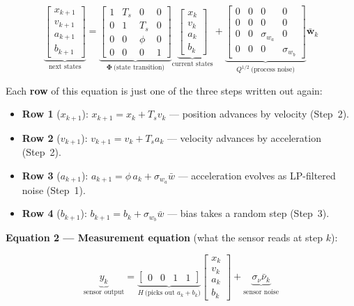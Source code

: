 \documentclass[12pt, a4paper]{article}
\begin{document}
\[
\underbrace{
\begin{bmatrix} x_{k+1} \\ v_{k+1} \\ a_{k+1} \\ b_{k+1} \end{bmatrix}
}_{\text{next states}}
=
\underbrace{
\begin{bmatrix}
  1 & T_s & 0    & 0 \\
  0 & 1   & T_s  & 0 \\
  0 & 0   & \phi & 0 \\
  0 & 0   & 0    & 1
\end{bmatrix}
}_{\boldsymbol{\Phi}\ \text{(state transition)}}
\underbrace{
\begin{bmatrix} x_k \\ v_k \\ a_k \\ b_k \end{bmatrix}
}_{\text{current states}}
+
\underbrace{
\begin{bmatrix}
  0 & 0 & 0            & 0            \\
  0 & 0 & 0            & 0            \\
  0 & 0 & \sigma_{w_a} & 0            \\
  0 & 0 & 0            & \sigma_{w_b}
\end{bmatrix}
}_{Q^{1/2}\ \text{(process noise)}}
\bar{\mathbf{w}}_k
\]

Each \textbf{row} of this equation is just one of the three steps
written out again:
\begin{itemize}[leftmargin=1.4em, topsep=2pt]
  \item \textbf{Row 1} ($x_{k+1}$): $x_{k+1} = x_k + T_s v_k$
        \quad --- position advances by velocity (Step~2).
  \item \textbf{Row 2} ($v_{k+1}$): $v_{k+1} = v_k + T_s a_k$
        \quad --- velocity advances by acceleration (Step~2).
  \item \textbf{Row 3} ($a_{k+1}$): $a_{k+1} = \phi\, a_k + \sigma_{w_a}\bar{w}$
        \quad --- acceleration evolves as LP-filtered noise (Step~1).
  \item \textbf{Row 4} ($b_{k+1}$): $b_{k+1} = b_k + \sigma_{w_b}\bar{w}$
        \quad --- bias takes a random step (Step~3).
\end{itemize}

\textbf{Equation 2 --- Measurement equation} (what the sensor reads at step $k$):

\[
  \underbrace{y_k}_{\text{sensor output}}
  =
  \underbrace{
  \begin{bmatrix} 0 & 0 & 1 & 1 \end{bmatrix}
  }_{H\ \text{(picks out } a_k + b_k\text{)}}
  \begin{bmatrix} x_k \\ v_k \\ a_k \\ b_k \end{bmatrix}
  + \underbrace{\sigma_\nu \bar{\nu}_k}_{\text{sensor noise}}
\]
\end{document}
